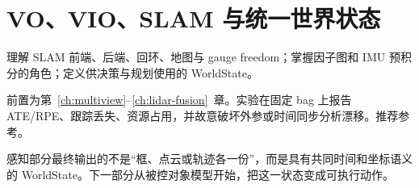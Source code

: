 \chapter{VO、VIO、SLAM 与统一世界状态}
\label{ch:slam-world}

\begin{learningobjectives}
理解 SLAM 前端、后端、回环、地图与 gauge freedom；掌握因子图和 IMU 预积分的角色；定义供决策与规划使用的 WorldState。
\end{learningobjectives}

\begin{prerequisites}
前置为第~\ref{ch:multiview}--\ref{ch:lidar-fusion}~章。实验在固定 bag 上报告 ATE/RPE、跟踪丢失、资源占用，并故意破坏外参或时间同步分析漂移。推荐参考\cite{barfoot2017state,dellaert2017factor}。
\end{prerequisites}


\begin{chaptertransition}
感知部分最终输出的不是“框、点云或轨迹各一份”，而是具有共同时间和坐标语义的 WorldState。下一部分从被控对象模型开始，把这一状态变成可执行动作。
\end{chaptertransition}

